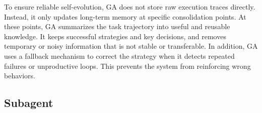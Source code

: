 To ensure reliable self-evolution, GA does not store raw execution traces directly. Instead, it only updates long-term memory at specific consolidation points.
At these points, GA summarizes the task trajectory into useful and reusable knowledge. It keeps successful strategies and key decisions, and removes temporary or noisy information that is not stable or transferable.
In addition, GA uses a fallback mechanism to correct the strategy when it detects repeated failures or unproductive loops. This prevents the system from reinforcing wrong behaviors.




\subsection{Subagent}









